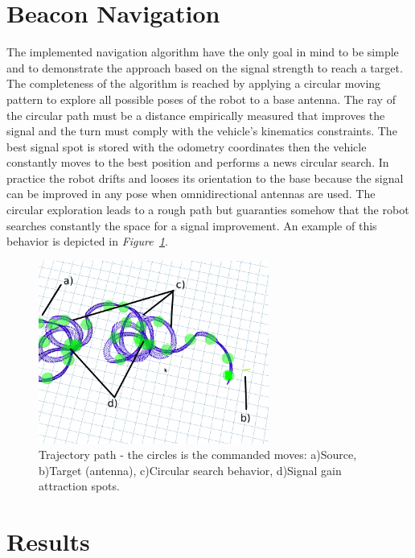 \documentclass[11pt,a4paper,oneside,twocolumn]{article}
\newcommand{\fig}[1]{\textit{Figure~\ref{#1}}}
\begin{document}
\section{Beacon Navigation}

The implemented navigation algorithm have the only goal in mind to be simple and
to demonstrate the approach based on the signal strength to reach a target.
The completeness of the algorithm is reached by applying a circular moving
pattern to explore all possible poses of the robot to a base antenna. The ray of
the circular path must be a distance empirically measured that improves the
signal and the turn must comply with the vehicle's kinematics constraints.
The best signal spot is stored with the odometry coordinates then the vehicle
constantly moves to the best position and performs a news circular search. In
practice the robot drifts and looses its orientation to the base because the
signal can be improved in any pose when omnidirectional antennas are used. The
circular exploration leads to a rough path but guaranties somehow that the robot
searches constantly the space for a signal improvement. An example of this
behavior is depicted in \fig{fig:path}.

\begin{figure}[ht]
	\begin{minipage}[b]{1\linewidth}
	    \centering
	    \includegraphics[width=\textwidth,height=6cm]{beacon.png}
	 	\caption{Trajectory path - the circles is the commanded moves: a)Source, 
	 	b)Target (antenna), c)Circular search behavior, d)Signal gain attraction spots.}
	 	\label{fig:path}
	\end{minipage}
\end{figure}

\section{Results}
\end{document}
